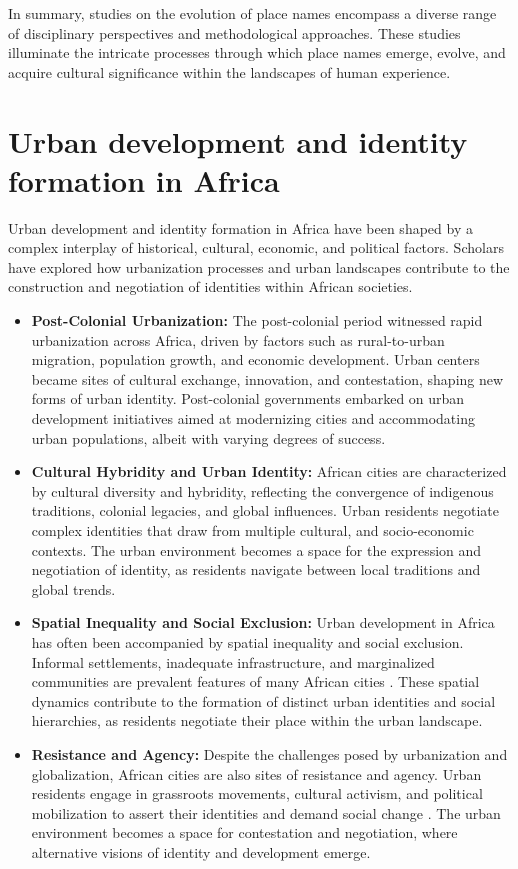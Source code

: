 \begin{itemize}
In summary, studies on the evolution of place names encompass a diverse range of disciplinary perspectives and methodological approaches. These studies illuminate the intricate processes through which place names emerge, evolve, and acquire cultural significance within the landscapes of human experience.
\end{itemize}

\section{Urban development and identity formation in Africa}
Urban development and identity formation in Africa have been shaped by a complex interplay of historical, cultural, economic, and political factors. Scholars have explored how urbanization processes and urban landscapes contribute to the construction and negotiation of identities within African societies.
\begin{itemize}
    \item \textbf{Post-Colonial Urbanization:}
    The post-colonial period witnessed rapid urbanization across Africa, driven by factors such as rural-to-urban migration, population growth, and economic development. Urban centers became sites of cultural exchange, innovation, and contestation, shaping new forms of urban identity\cite{Onilude}. Post-colonial governments embarked on urban development initiatives aimed at modernizing cities and accommodating urban populations, albeit with varying degrees of success.
    \item \textbf{Cultural Hybridity and Urban Identity:}
    African cities are characterized by cultural diversity and hybridity, reflecting the convergence of indigenous traditions, colonial legacies, and global influences. Urban residents negotiate complex identities that draw from multiple cultural, and socio-economic contexts\cite{Onilude}. The urban environment becomes a space for the expression and negotiation of identity, as residents navigate between local traditions and global trends.
    \item \textbf{Spatial Inequality and Social Exclusion:}
    Urban development in Africa has often been accompanied by spatial inequality and social exclusion. Informal settlements, inadequate infrastructure, and marginalized communities are prevalent features of many African cities \cite{falola2008history}. These spatial dynamics contribute to the formation of distinct urban identities and social hierarchies, as residents negotiate their place within the urban landscape.
    \item \textbf{Resistance and Agency:}
    Despite the challenges posed by urbanization and globalization, African cities are also sites of resistance and agency. Urban residents engage in grassroots movements, cultural activism, and political mobilization to assert their identities and demand social change \cite{Onilude}. The urban environment becomes a space for contestation and negotiation, where alternative visions of identity and development emerge.
\end{itemize}
